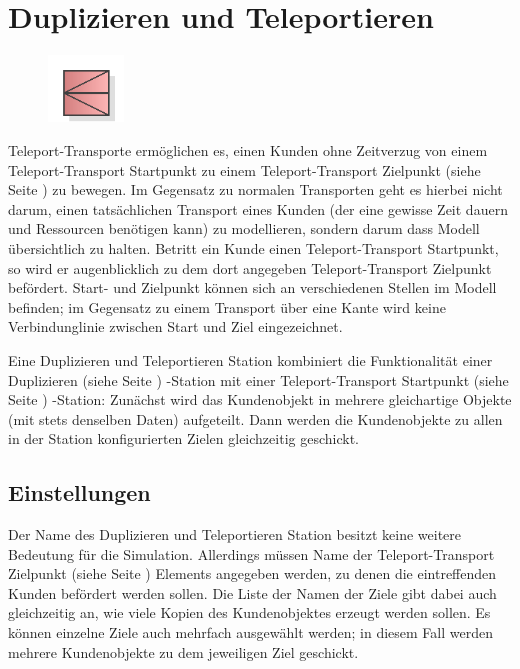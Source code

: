\section{Duplizieren und Teleportieren}
\label{ref:ModelElementTeleportSourceMulti}

\begin{figure}
\vspace{-22pt}
\includegraphics[width=2cm]{imageModelElementTeleportSourceMulti.png}
\vspace{-22pt}
\end{figure}

Teleport-Transporte ermöglichen es, einen Kunden ohne Zeitverzug
von einem Teleport-Transport Startpunkt zu einem 
Teleport-Transport Zielpunkt (siehe Seite \pageref{ref:ModelElementTeleportDestination}) 
zu bewegen. Im Gegensatz zu normalen Transporten geht es hierbei nicht darum,
einen tatsächlichen Transport eines Kunden (der eine gewisse Zeit dauern und
Ressourcen benötigen kann) zu modellieren, sondern darum dass Modell übersichtlich
zu halten. Betritt ein Kunde einen Teleport-Transport Startpunkt, so wird er
augenblicklich zu dem dort angegeben Teleport-Transport Zielpunkt befördert.
Start- und Zielpunkt können sich an verschiedenen Stellen im Modell befinden;
im Gegensatz zu einem Transport über eine Kante wird keine Verbindunglinie
zwischen Start und Ziel eingezeichnet.

Eine Duplizieren und Teleportieren Station kombiniert die Funktionalität
einer Duplizieren (siehe Seite \pageref{ref:ModelElementDuplicate}) -Station mit einer
Teleport-Transport Startpunkt (siehe Seite \pageref{ref:ModelElementTeleportSource}) -Station:
Zunächst wird das Kundenobjekt in mehrere gleichartige Objekte (mit stets denselben Daten)
aufgeteilt. Dann werden die Kundenobjekte zu allen in der Station konfigurierten Zielen
gleichzeitig geschickt.

\subsection*{Einstellungen}

Der Name des Duplizieren und Teleportieren Station besitzt keine weitere Bedeutung
für die Simulation. Allerdings müssen Name der
Teleport-Transport Zielpunkt (siehe Seite \pageref{ref:ModelElementTeleportDestination}) 
Elements angegeben werden, zu denen die eintreffenden Kunden befördert werden sollen.
Die Liste der Namen der Ziele gibt dabei auch gleichzeitig an, wie viele Kopien
des Kundenobjektes erzeugt werden sollen. Es können einzelne Ziele auch mehrfach
ausgewählt werden; in diesem Fall werden mehrere Kundenobjekte zu dem jeweiligen Ziel geschickt.  


